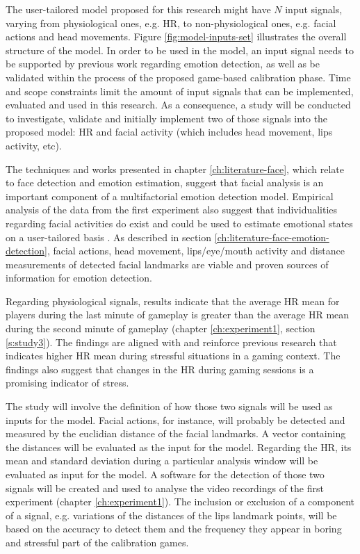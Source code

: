 The user-tailored model proposed for this research might have $N$ input signals, varying from physiological ones, e.g. HR, to non-physiological ones, e.g. facial actions and head movements. Figure \ref{fig:model-inputs-set} illustrates the overall structure of the model. In order to be used in the model, an input signal needs to be supported by previous work regarding emotion detection, as well as be validated within the process of the proposed game-based calibration phase. Time and scope constraints limit the amount of input signals that can be implemented, evaluated and used in this research. As a consequence, a study will be conducted to investigate, validate and initially implement two of those signals into the proposed model: HR and facial activity (which includes head movement, lips activity, etc).

The techniques and works presented in chapter \ref{ch:literature-face}, which relate to face detection and emotion estimation, suggest that facial analysis is an important component of a multifactorial emotion detection model. Empirical analysis of the data from the first experiment also suggest that individualities regarding facial activities do exist and could be used to estimate emotional states on a user-tailored basis \parencite{bevilacqua2016variations}. As described in section \ref{ch:literature-face-emotion-detection}, facial actions, head movement, lips/eye/mouth activity and distance measurements of detected facial landmarks are viable and proven sources of information for emotion detection.

Regarding physiological signals, results indicate that the average HR mean for players during the last minute of gameplay is greater than the average HR mean during the second minute of gameplay (chapter \ref{ch:experiment1}, section \ref{s:study3}). The findings are aligned with and reinforce previous research that indicates higher HR mean during stressful situations in a gaming context. The findings also suggest that changes in the HR during gaming sessions is a promising indicator of stress.

The study will involve the definition of how those two signals will be used as inputs for the model. Facial actions, for instance, will probably be detected and measured by the euclidian distance of the facial landmarks. A vector containing the distances will be evaluated as the input for the model. Regarding the HR, its mean and standard deviation during a particular analysis window will be evaluated as input for the model. A software for the detection of those two signals will be created and used to analyse the video recordings of the first experiment (chapter \ref{ch:experiment1}). The inclusion or exclusion of a component of a signal, e.g. variations of the distances of the lips landmark points, will be based on the accuracy to detect them and the frequency they appear in boring and stressful part of the calibration games.

